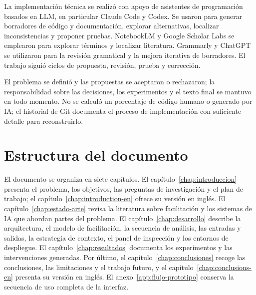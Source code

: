 La implementación técnica se realizó con apoyo de asistentes de programación basados en LLM, en particular Claude Code y Codex. Se usaron para generar borradores de código y documentación, explorar alternativas, localizar inconsistencias y proponer pruebas. NotebookLM y Google Scholar Labs se emplearon para explorar términos y localizar literatura. Grammarly y ChatGPT se utilizaron para la revisión gramatical y la mejora iterativa de borradores. El trabajo siguió ciclos de propuesta, revisión, prueba y corrección.

El problema se definió y las propuestas se aceptaron o rechazaron; la responsabilidad sobre las decisiones, los experimentos y el texto final se mantuvo en todo momento. No se calculó un porcentaje de código humano o generado por IA; el historial de Git documenta el proceso de implementación con suficiente detalle para reconstruirlo.

\section{Estructura del documento}

El documento se organiza en siete capítulos. El capítulo~\ref{chap:introduccion} presenta el problema, los objetivos, las preguntas de investigación y el plan de trabajo; el capítulo~\ref{chap:introduction-en} ofrece su versión en inglés. El capítulo~\ref{chap:estado-arte} revisa la literatura sobre facilitación y los sistemas de IA que abordan partes del problema. El capítulo~\ref{chap:desarrollo} describe la arquitectura, el modelo de facilitación, la secuencia de análisis, las entradas y salidas, la estrategia de contexto, el panel de inspección y los entornos de despliegue. El capítulo~\ref{chap:resultados} documenta los experimentos y las intervenciones generadas. Por último, el capítulo~\ref{chap:conclusiones} recoge las conclusiones, las limitaciones y el trabajo futuro, y el capítulo~\ref{chap:conclusions-en} presenta su versión en inglés. El anexo~\ref{app:flujo-prototipo} conserva la secuencia de uso completa de la interfaz.
